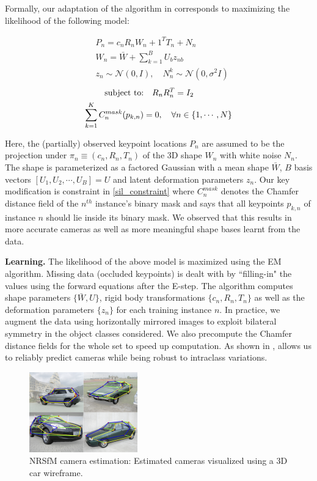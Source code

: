 Formally, our adaptation of the \nrsfm algorithm in \cite{Torresani2008NRSFM} corresponds to maximizing the likelihood of the following model:

\begin{equation}
\begin{aligned}
&{P_{n}} = c_nR_nW_{n} + 1^TT_{n} + N_{n}\\
&W_n = \bar{W} + \sum\limits_{k=1}^B U_b z_{nb} \\
&z_n \sim \mathcal{N}(0,I), \quad N^k_{n}\sim \mathcal{N}(0,\sigma^2 I)
\end{aligned}
\end{equation}
\begin{align}
\text{subject to:}\nonumber &\quad R_nR_{n}^{T} = I_2 \\
\eqlabel{sil_constraint}
\sum\limits_{k=1}^K C_{n}^{mask}(p_{k,n}) &= 0, \quad \forall n\in \{1,\cdots,N\}
\end{align}

Here, the (partially) observed keypoint locations $P_n$ are assumed to be the projection under $\pi_n \equiv (c_n, R_n, T_n)$ of the 3D shape $W_n$ with white noise $N_n$. The shape is parameterized as a factored Gaussian with a mean shape $\bar{W}$, $B$ basis vectors $[U_1,U_2, \cdots,U_B] = U$ and latent deformation parameters $z_n$. Our key modification is constraint in \eqref{sil_constraint} where $C_{n}^{mask}$ denotes the Chamfer distance field of the $n^{th}$ instance's binary mask and says that all keypoints $p_{k,n}$ of instance $n$ should lie inside its binary mask. We observed that this results in more accurate cameras as well as more meaningful shape bases learnt from the data.

\vspace{3mm}
\noindent \textbf{Learning.} The likelihood of the above model is maximized using the EM algorithm. Missing data (occluded keypoints) is dealt with by ``filling-in" the values using the forward equations after the E-step. The algorithm computes shape parameters $\{\bar{W},U\}$, rigid body transformations $\{c_n,R_n,T_n\}$ as well as the deformation parameters $\{z_n\}$ for each training instance $n$. In practice, we augment the data using horizontally mirrored images to exploit bilateral symmetry in the object classes considered. We also precompute the Chamfer distance fields for the whole set to speed up computation. As shown in , \nrsfm  allows us to reliably predict cameras while being robust to intraclass variations.

\begin{figure}[htb!]
  \centering
\includegraphics[width=.8\linewidth]{figures/categoryshapes/NRSFMCars.pdf}
\caption{NRSfM camera estimation: Estimated cameras visualized using a 3D car wireframe.}
\end{figure}
